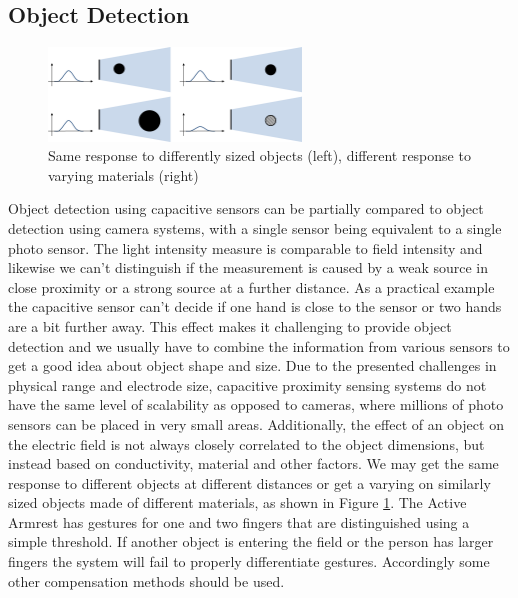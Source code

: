 \subsection{Object Detection}
\begin{figure}[h]
\centering
\includegraphics[width=0.6\textwidth]{images/limit_detection.png}
\caption{Same response to differently sized objects (left), different response to varying materials (right)}
\label{fig:disc_obj_detection}
\end{figure}
Object detection using capacitive sensors can be partially compared to object detection using camera systems, with a single sensor being equivalent to a single photo sensor. The light intensity measure is comparable to field intensity and likewise we can't distinguish if the measurement is caused by a weak source in close proximity or a strong source at a further distance. As a practical example the capacitive sensor can't decide if one hand is close to the sensor or two hands are a bit further away. This effect makes it challenging to provide object detection and we usually have to combine the information from various sensors to get a good idea about object shape and size. Due to the presented challenges in physical range and electrode size, capacitive proximity sensing systems do not have the same level of scalability as opposed to cameras, where millions of photo sensors can be placed in very small areas. 
Additionally, the effect of an object on the electric field is not always closely correlated to the object dimensions, but instead based on conductivity, material and other factors. We may get the same response to different objects at different distances or get a varying on similarly sized objects made of different materials, as shown in Figure \ref{fig:disc_obj_detection}. 
The Active Armrest has gestures for one and two fingers that are distinguished using a simple threshold. If another object is entering the field or the person has larger fingers the system will fail to properly differentiate gestures. Accordingly some other compensation methods should be used.

